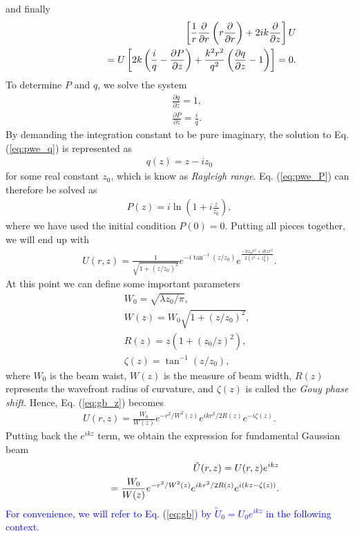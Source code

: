 and finally
\begin{eqnarray}
	&& \left[ \frac{1}{r} \frac{\partial}{\partial r} \left( r \frac{\partial}{\partial r}\right) + 2ik \frac{\partial}{\partial z} \right] U
	\nonumber\\
	&&\hspace{0.5in} = U \left[ 2k \left( \frac{i}{q} - \frac{\partial P}{\partial z} \right)
	+ \frac{k^2 r^2}{q^2} \left( \frac{\partial q}{\partial z} - 1 \right) \right] = 0.
	\nonumber
\end{eqnarray}
To determine $P$ and $q$, we solve the system
\begin{eqnarray}
	&&\frac{\partial q}{\partial z} = 1,
	\label{eq:pwe_q}\\
	&&\frac{\partial P}{\partial z} = \frac{i}{q}.
	\label{eq:pwe_P}
\end{eqnarray}
By demanding the integration constant to be pure imaginary, the solution to Eq. (\ref{eq:pwe_q}) is represented as
\begin{eqnarray}
	q(z) = z - i z_0
\end{eqnarray}
for some real constant $z_0$, which is know as {\em Rayleigh range}. Eq. (\ref{eq:pwe_P}) can therefore be solved as
\begin{eqnarray}
	P(z) = i \ln (1 + i \frac{z}{z_0}),
\end{eqnarray}
where we have used the initial condition $P(0) = 0$. Putting all pieces together, we will end up with
\begin{eqnarray}
	U(r, z) = \frac{1}{\sqrt{1 + (z/z_0)^2}} e^{-i\tan^{-1} (z/z_0)} 
	e^{\frac{-k z_0 r^2 + i k z r^2}{2(z^2 + z_0^2)}}.
	\label{eq:gb_z}
\end{eqnarray}
At this point we can define some important parameters
\begin{eqnarray}
	&& W_0 = \sqrt{\lambda z_0/\pi},
	\nonumber\\
	&& W(z) = W_0 \sqrt{1 + (z/z_0)^2},
	\nonumber\\
	&& R(z) = z(1 + (z_0/z)^2),
	\nonumber\\
	&& \zeta(z) = \tan^{-1}(z/z_0),
	\nonumber
\end{eqnarray}
where $W_0$ is the beam waist, $W(z)$ is the measure of beam width, $R(z)$ represents the wavefront radius of curvature, and $\zeta(z)$ is called the {\em Gouy phase shift}. Hence, Eq. (\ref{eq:gb_z}) becomes
\begin{eqnarray}
	U(r, z) = \frac{W_0}{W(z)} e^{-r^2/W^2(z)} e^{i k r^2/ 2 R(z)} e^{-i \zeta(z)}.
	\nonumber
\end{eqnarray}
Putting back the $e^{ikz}$ term, we obtain the expression for fundamental Gaussian beam
\begin{eqnarray}
	&& \tilde{U}(r, z) = U(r, z) e^{ikz}
	\nonumber\\
	&& \hspace{0.3in} = \frac{W_0}{W(z)} e^{-r^2/W^2(z)} e^{i k r^2/ 2 R(z)} e^{i (kz - \zeta(z))}.
	\label{eq:gb}
\end{eqnarray}
\textcolor{blue}{
For convenience, we will refer to Eq. (\ref{eq:gb}) by $\tilde{U}_0 = U_0 e^{ikz}$ in the following context.
}

